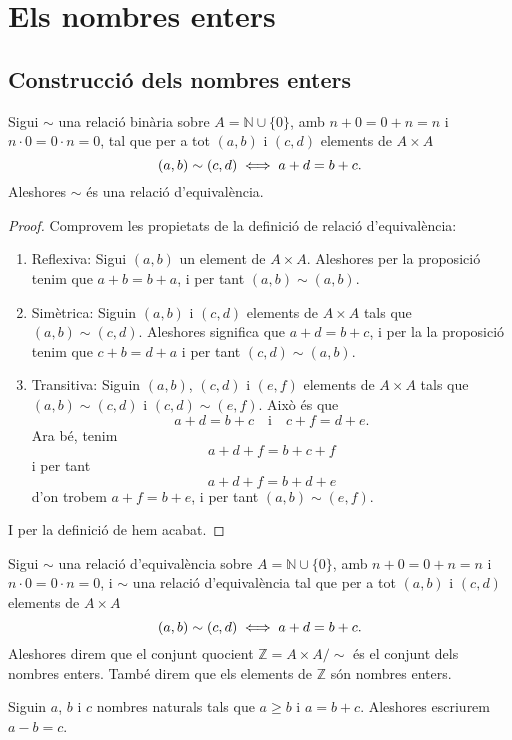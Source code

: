 \documentclass[../../Main.tex]{subfiles}
\begin{document}
\section{Els nombres enters}
	\subsection{Construcció dels nombres enters}
	\begin{proposition}
		Sigui \(\sim\) una relació binària sobre \(A=\mathbb{N}\cup\{0\}\), amb \(n+0=0+n=n\) i \(n\cdot 0=0\cdot n=0\), tal que per a tot \((a,b)\) i \((c,d)\) elements de \(A\times A\)
		\[(a,b)\sim(c,d)\iff a+d=b+c.\]
		Aleshores \(\sim\) és una relació d'equivalència.
		\begin{proof}
			Comprovem les propietats de la definició de relació d'equivalència:
			\begin{enumerate}
				\item Reflexiva: Sigui \((a,b)\) un element de \(A\times A\). Aleshores per la proposició  tenim que \(a+b=b+a\), i per tant \((a,b)\sim(a,b)\).
				\item Simètrica: Siguin \((a,b)\) i \((c,d)\) elements de \(A\times A\) tals que \((a,b)\sim(c,d)\). Aleshores significa que \(a+d=b+c\), i per la la proposició  tenim que \(c+b=d+a\) i per tant \((c,d)\sim(a,b)\).
				\item Transitiva: Siguin \((a,b)\), \((c,d)\) i \((e,f)\) elements de \(A\times A\) tals que \((a,b)\sim(c,d)\) i \((c,d)\sim(e,f)\). Això és que
				\[a+d=b+c\quad\text{i}\quad c+f=d+e.\]
				Ara bé, tenim
				\[a+d+f=b+c+f\]
				i per tant
				\[a+d+f=b+d+e\]
				d'on trobem \(a+f=b+e\), i per tant \((a,b)\sim(e,f)\).
			\end{enumerate}
			I per la definició de  hem acabat.
		\end{proof}
	\end{proposition}
	\begin{definition}
		\label{def:nombres enters}
		Sigui \(\sim\) una relació d'equivalència sobre \(A=\mathbb{N}\cup\{0\}\), amb \(n+0=0+n=n\) i \(n\cdot 0=0\cdot n=0\), i \(\sim\) una relació d'equivalència tal que per a tot \((a,b)\) i \((c,d)\) elements de \(A\times A\)
		\[(a,b)\sim(c,d)\iff a+d=b+c.\]
		Aleshores direm que el conjunt quocient \(\mathbb{Z}=A\times A/\sim\) és el conjunt dels nombres enters. També direm que els elements de \(\mathbb{Z}\) són nombres enters.
	\end{definition}
	\begin{definition}
		\label{def:resta de nombres naturals}
		Siguin \(a\), \(b\) i \(c\) nombres naturals tals que \(a\geq b\) i \(a=b+c\). Aleshores escriurem \(a-b=c\).
	\end{definition}
\end{document}
